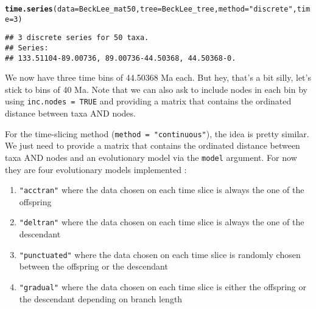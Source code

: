 \documentclass{article}\usepackage[]{graphicx}\usepackage[]{color}
\makeatletter
\newcommand{\hlnum}[1]{\textcolor[rgb]{0.686,0.059,0.569}{#1}}%
\newcommand{\hlstr}[1]{\textcolor[rgb]{0.192,0.494,0.8}{#1}}%
\newcommand{\hlstd}[1]{\textcolor[rgb]{0.345,0.345,0.345}{#1}}%
\newcommand{\hlkwc}[1]{\textcolor[rgb]{0.333,0.667,0.333}{#1}}%
\newcommand{\hlkwd}[1]{\textcolor[rgb]{0.737,0.353,0.396}{\textbf{#1}}}%
\newenvironment{kframe}{%
 \def\at@end@of@kframe{}%
 \ifinner\ifhmode%
  \def\at@end@of@kframe{\end{minipage}}%
  \begin{minipage}{\columnwidth}%
 \fi\fi%
 \def\FrameCommand##1{\hskip\@totalleftmargin \hskip-\fboxsep
 \colorbox{shadecolor}{##1}\hskip-\fboxsep
     \hskip-\linewidth \hskip-\@totalleftmargin \hskip\columnwidth}%
 \MakeFramed {\advance\hsize-\width
   \@totalleftmargin\z@ \linewidth\hsize
   \@setminipage}}%
 {\par\unskip\endMakeFramed%
 \at@end@of@kframe}
\newenvironment{knitrout}{}{} %
\makeatother
\begin{document}
\begin{knitrout}
\color{fgcolor}\begin{kframe}
\begin{alltt}
\hlkwd{time.series}\hlstd{(}\hlkwc{data} \hlstd{= BeckLee_mat50,} \hlkwc{tree} \hlstd{= BeckLee_tree,} \hlkwc{method} \hlstd{=} \hlstr{"discrete"}\hlstd{,} \hlkwc{time} \hlstd{=} \hlnum{3}\hlstd{)}
\end{alltt}


{\ttfamily\noindent\itshape\color{messagecolor}{\#\# No FADLAD table has been provided so every tip is assumed to interval single points in time.}}\begin{verbatim}
## 3 discrete series for 50 taxa. 
## Series:
## 133.51104-89.00736, 89.00736-44.50368, 44.50368-0.
\end{verbatim}
\end{kframe}
\end{knitrout}
We now have three time bins of 44.50368 Ma each. But hey, that's a bit silly, let's stick to bins of 40 Ma.
Note that we can also ask to include nodes in each bin by using \texttt{inc.nodes = TRUE} and providing a matrix that contains the ordinated distance between taxa AND nodes.

For the time-slicing method (\texttt{method = "continuous"}), the idea is pretty similar.
We just need to provide a matrix that contains the ordinated distance between taxa AND nodes and an evolutionary model via the \texttt{model} argument.
For now they are four evolutionary models implemented \cite{GuillermeSTD}:
\begin{enumerate}
\item \texttt{"acctran"} where the data chosen on each time slice is always the one of the offspring
\item \texttt{"deltran"} where the data chosen on each time slice is always the one of the descendant
\item \texttt{"punctuated"} where the data chosen on each time slice is randomly chosen between the offspring or the descendant
\item \texttt{"gradual"} where the data chosen on each time slice is either the offspring or the descendant depending on branch length
\end{enumerate}
\end{document}
